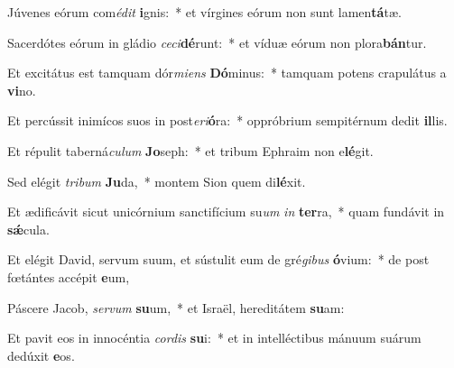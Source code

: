 \item Júvenes eórum com\textit{é}\textit{dit} \textbf{i}gnis:~* et vírgines eórum non sunt lamen\textbf{tá}tæ.
\item Sacerdótes eórum in gládio \textit{ce}\textit{ci}\textbf{dé}runt:~* et víduæ eórum non plora\textbf{bán}tur.
\item Et excitátus est tamquam dór\textit{mi}\textit{ens} \textbf{Dó}minus:~* tamquam potens crapulátus a \textbf{vi}no.
\item Et percússit inimícos suos in post\textit{e}\textit{ri}\textbf{ó}ra:~* oppróbrium sempitérnum dedit \textbf{il}lis.
\item Et répulit taberná\textit{cu}\textit{lum} \textbf{Jo}seph:~* et tribum Ephraim non e\textbf{lé}git.
\item Sed elégit \textit{tri}\textit{bum} \textbf{Ju}da,~* montem Sion quem di\textbf{lé}xit.
\item Et ædificávit sicut unicórnium sanctifícium su\textit{um} \textit{in} \textbf{ter}ra,~* quam fundávit in \textbf{sǽ}cula.
\item Et elégit David, servum suum, et sústulit eum de gré\textit{gi}\textit{bus} \textbf{ó}vium:~* de post fœtántes accépit \textbf{e}um,
\item Páscere Jacob, \textit{ser}\textit{vum} \textbf{su}um,~* et Israël, hereditátem \textbf{su}am:
\item Et pavit eos in innocéntia \textit{cor}\textit{dis} \textbf{su}i:~* et in intelléctibus mánuum suárum dedúxit \textbf{e}os.
